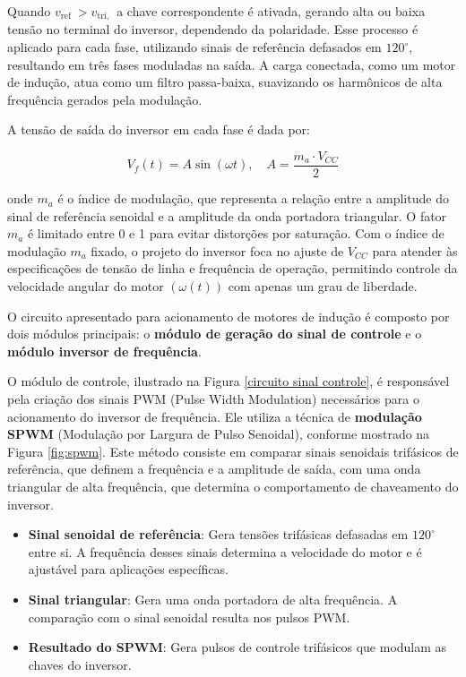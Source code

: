 \documentclass[a4paper, 11pt]{article}
\begin{document}
Quando $v_{\text {ref }}>v_{\text {tri, }}$ a chave correspondente é ativada, gerando alta ou baixa tensão no terminal do inversor, dependendo da polaridade. Esse processo é aplicado para cada fase, utilizando sinais de referência defasados em $120^{\circ}$, resultando em três fases moduladas na saída. A carga conectada, como um motor de indução, atua como um filtro passa-baixa, suavizando os harmônicos de alta frequência gerados pela modulação.

A tensão de saída do inversor em cada fase é dada por:

$$
V_f(t)=A \sin (\omega t), \quad A=\frac{m_a \cdot V_{C C}}{2}
$$

onde $m_a$ é o índice de modulação, que representa a relação entre a amplitude do sinal de referência senoidal e a amplitude da onda portadora triangular. O fator $m_a$ é limitado entre 0 e 1 para evitar distorções por saturação.
Com o índice de modulação $m_a$ fixado, o projeto do inversor foca no ajuste de $V_{C C}$ para atender às especificações de tensão de linha e frequência de operação, permitindo controle da velocidade angular do motor $(\omega(t))$ com apenas um grau de liberdade.

O circuito apresentado para acionamento de motores de indução é composto por dois módulos principais: o \textbf{módulo de geração do sinal de controle} e o \textbf{módulo inversor de frequência}.

O módulo de controle, ilustrado na Figura \ref{circuito sinal controle}, é responsável pela criação dos sinais PWM (Pulse Width Modulation) necessários para o acionamento do inversor de frequência. Ele utiliza a técnica de \textbf{modulação SPWM} (Modulação por Largura de Pulso Senoidal), conforme mostrado na Figura \ref{fig:spwm}. Este método consiste em comparar sinais senoidais trifásicos de referência, que definem a frequência e a amplitude de saída, com uma onda triangular de alta frequência, que determina o comportamento de chaveamento do inversor.

\begin{itemize}
    \item \textbf{Sinal senoidal de referência}: Gera tensões trifásicas defasadas em $120^\circ$ entre si. A frequência desses sinais determina a velocidade do motor e é ajustável para aplicações específicas.
    \item \textbf{Sinal triangular}: Gera uma onda portadora de alta frequência. A comparação com o sinal senoidal resulta nos pulsos PWM.
    \item \textbf{Resultado do SPWM}: Gera pulsos de controle trifásicos que modulam as chaves do inversor.
\end{itemize}
\end{document}

